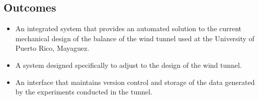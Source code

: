 \subsection{Outcomes}

	\begin{itemize}
		\item An integrated system that provides an automated solution to the current mechanical
		design of the balance of the wind tunnel used at the University of Puerto Rico, Mayaguez.
		\item A system designed specifically to adjust to the design of the wind tunnel.
		\item An interface that maintains version control and storage of the data generated by the
		experiments conducted in the tunnel.
	\end{itemize}
